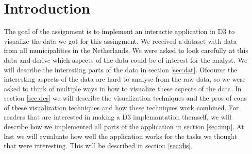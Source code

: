 \section{Introduction}
The goal of the assignment is to implement an interactie application in D3 to visualize the data we got for this assingment. We received a dataset with data from all municipalities in the Netherlands.  We were asked to look carefully at this data and derive which aspects of the data could be of interest for the analyst. We will describe the interesting parts of the data in section \ref{sec:dat}. Ofcourse the interesting aspects of the data are hard to analyse from the raw data, so we were asked to think of multiple ways in how to visualize these aspects of the data. In section \ref{sec:des} we will describe the visualization techniques and the pros of cons of these visualization techniques and how these techniques work combined. For readers that are interested in making a D3 implemantation themself, we will describe how we implemented all parts of the application in section  \ref{sec:imp}. At last we will evualuate how well the application works for the tasks we thought that were interesting. This will be described in section  \ref{sec:dis}.